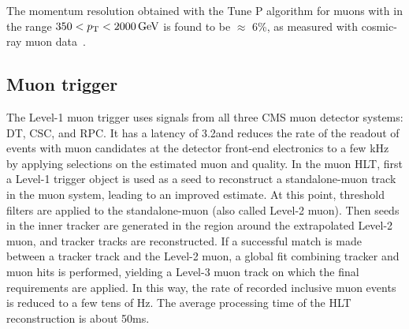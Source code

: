The momentum resolution obtained with the Tune P algorithm for muons with \pt in the range $350 < p_{\mathrm{T}} < 2000\,\text{Ge\hspace{-.08em}V}$ is found to be $\approx$ 6\%, as measured with cosmic-ray muon data~\cite{Chatrchyan:2012xi,Radogna:2205870}.


\subsection{Muon trigger}\label{subsec:mutrigger}

The Level-1 muon trigger uses signals from all three CMS muon detector systems: DT, CSC, and RPC. It has a latency of 3.2\mus and reduces the rate of the readout of events with muon candidates
at the detector front-end electronics to a few kHz by applying selections on the estimated muon \pt and quality.
In the muon HLT, first a Level-1 trigger object is used as a seed to reconstruct a standalone-muon track in the muon system, leading to an improved \pt estimate. At this point, \pt threshold filters are applied to the standalone-muon (also called Level-2 muon). Then seeds in the inner tracker are generated in the region around the extrapolated Level-2 muon, and tracker tracks are reconstructed. If a successful match is made between a tracker track and the Level-2 muon, a global fit combining tracker and muon hits is performed, yielding a Level-3 muon track on which the final \pt requirements are applied. In this way, the rate of recorded inclusive muon events is reduced to a few tens of Hz. The average processing time of the HLT reconstruction is about 50\unit{ms}.

